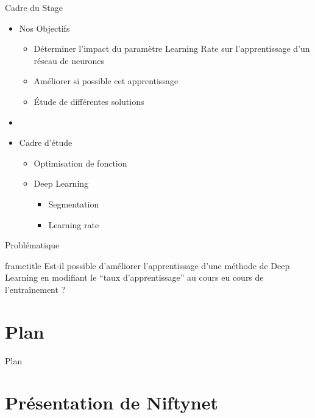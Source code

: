 \documentclass{beamer}
\begin{document}
\begin{frame}{Cadre du Stage}
  \begin{itemize}
    \item Nos Objectifs
    \begin{itemize}
      \item Déterminer l'impact du paramètre Learning Rate sur l'apprentissage d'un réseau de neurones
      \item Améliorer si possible cet apprentissage
      \item \'Etude de différentes solutions
    \end{itemize}
    \item[]
    \item Cadre d'étude
    \begin{itemize}
      \item Optimisation de fonction
      \item Deep Learning
      \begin{itemize}
        \item Segmentation
        \item Learning rate
      \end{itemize}
    \end{itemize}
  \end{itemize}
\end{frame}

\begin{frame}{Problématique}
  \begin{beamercolorbox}[ht=8ex,dp=1.5ex,center]{frametitle}
    Est-il possible d'améliorer l'apprentissage d'une méthode de Deep Learning en modifiant le ``taux d'apprentissage'' au cours eu cours de l'entraînement ?
  \end{beamercolorbox}
\end{frame}

\section*{Plan}
\begin{frame}{Plan}
  \tableofcontents
\end{frame}

\section{Présentation de Niftynet}
\subsection*{}
\end{document}
